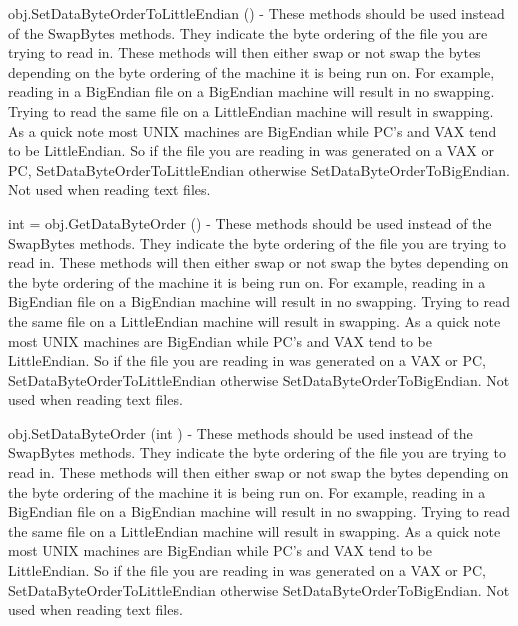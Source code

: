 \begin{DoxyItemize}
\item {\ttfamily obj.\-Set\-Data\-Byte\-Order\-To\-Little\-Endian ()} -\/ These methods should be used instead of the Swap\-Bytes methods. They indicate the byte ordering of the file you are trying to read in. These methods will then either swap or not swap the bytes depending on the byte ordering of the machine it is being run on. For example, reading in a Big\-Endian file on a Big\-Endian machine will result in no swapping. Trying to read the same file on a Little\-Endian machine will result in swapping. As a quick note most U\-N\-I\-X machines are Big\-Endian while P\-C's and V\-A\-X tend to be Little\-Endian. So if the file you are reading in was generated on a V\-A\-X or P\-C, Set\-Data\-Byte\-Order\-To\-Little\-Endian otherwise Set\-Data\-Byte\-Order\-To\-Big\-Endian. Not used when reading text files.  
\item {\ttfamily int = obj.\-Get\-Data\-Byte\-Order ()} -\/ These methods should be used instead of the Swap\-Bytes methods. They indicate the byte ordering of the file you are trying to read in. These methods will then either swap or not swap the bytes depending on the byte ordering of the machine it is being run on. For example, reading in a Big\-Endian file on a Big\-Endian machine will result in no swapping. Trying to read the same file on a Little\-Endian machine will result in swapping. As a quick note most U\-N\-I\-X machines are Big\-Endian while P\-C's and V\-A\-X tend to be Little\-Endian. So if the file you are reading in was generated on a V\-A\-X or P\-C, Set\-Data\-Byte\-Order\-To\-Little\-Endian otherwise Set\-Data\-Byte\-Order\-To\-Big\-Endian. Not used when reading text files.  
\item {\ttfamily obj.\-Set\-Data\-Byte\-Order (int )} -\/ These methods should be used instead of the Swap\-Bytes methods. They indicate the byte ordering of the file you are trying to read in. These methods will then either swap or not swap the bytes depending on the byte ordering of the machine it is being run on. For example, reading in a Big\-Endian file on a Big\-Endian machine will result in no swapping. Trying to read the same file on a Little\-Endian machine will result in swapping. As a quick note most U\-N\-I\-X machines are Big\-Endian while P\-C's and V\-A\-X tend to be Little\-Endian. So if the file you are reading in was generated on a V\-A\-X or P\-C, Set\-Data\-Byte\-Order\-To\-Little\-Endian otherwise Set\-Data\-Byte\-Order\-To\-Big\-Endian. Not used when reading text files.  

\end{DoxyItemize}
